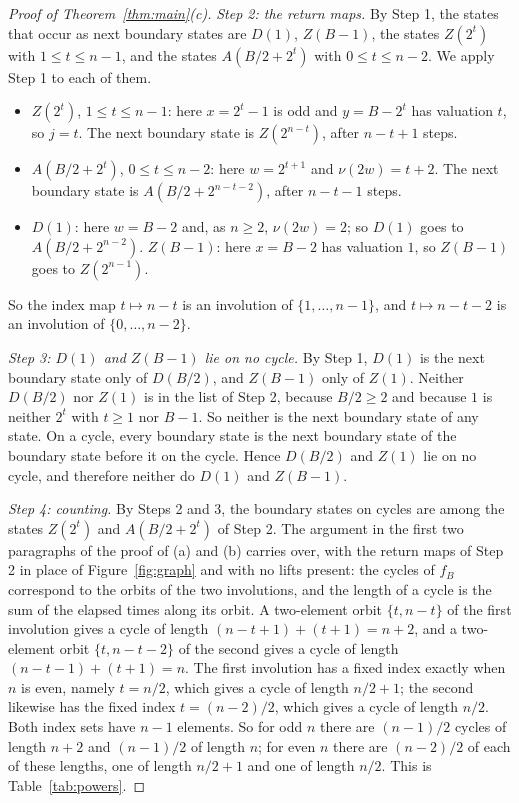 \documentclass[11pt]{amsart}
\theoremstyle{definition}
\theoremstyle{remark}
\newcommand{\vt}{\nu}
\begin{document}
\begin{proof}[Proof of Theorem~\ref{thm:main}\textup{(c)}]
\emph{Step 2: the return maps.} By Step 1, the states that occur as next boundary states are $D(1)$, $Z(B-1)$, the states $Z(2^t)$ with $1\le t\le n-1$, and the states $A(B/2+2^t)$ with $0\le t\le n-2$. We apply Step 1 to each of them.
\begin{itemize}
\item $Z(2^t)$, $1\le t\le n-1$: here $x=2^t-1$ is odd and $y=B-2^t$ has valuation $t$, so $j=t$. The next boundary state is $Z(2^{n-t})$, after $n-t+1$ steps.
\item $A(B/2+2^t)$, $0\le t\le n-2$: here $w=2^{t+1}$ and $\vt(2w)=t+2$. The next boundary state is $A(B/2+2^{n-t-2})$, after $n-t-1$ steps.
\item $D(1)$: here $w=B-2$ and, as $n\ge2$, $\vt(2w)=2$; so $D(1)$ goes to $A(B/2+2^{n-2})$. $Z(B-1)$: here $x=B-2$ has valuation $1$, so $Z(B-1)$ goes to $Z(2^{n-1})$.
\end{itemize}
So the index map $t\mapsto n-t$ is an involution of $\{1,\dots,n-1\}$, and $t\mapsto n-t-2$ is an involution of $\{0,\dots,n-2\}$.

\emph{Step 3: $D(1)$ and $Z(B-1)$ lie on no cycle.} By Step 1, $D(1)$ is the next boundary state only of $D(B/2)$, and $Z(B-1)$ only of $Z(1)$. Neither $D(B/2)$ nor $Z(1)$ is in the list of Step 2, because $B/2\ge2$ and because $1$ is neither $2^t$ with $t\ge1$ nor $B-1$. So neither is the next boundary state of any state. On a cycle, every boundary state is the next boundary state of the boundary state before it on the cycle. Hence $D(B/2)$ and $Z(1)$ lie on no cycle, and therefore neither do $D(1)$ and $Z(B-1)$.

\emph{Step 4: counting.} By Steps 2 and 3, the boundary states on cycles are among the states $Z(2^t)$ and $A(B/2+2^t)$ of Step 2. The argument in the first two paragraphs of the proof of (a) and (b) carries over, with the return maps of Step 2 in place of Figure~\ref{fig:graph} and with no lifts present: the cycles of $f_B$ correspond to the orbits of the two involutions, and the length of a cycle is the sum of the elapsed times along its orbit. A two-element orbit $\{t,n-t\}$ of the first involution gives a cycle of length $(n-t+1)+(t+1)=n+2$, and a two-element orbit $\{t,n-t-2\}$ of the second gives a cycle of length $(n-t-1)+(t+1)=n$. The first involution has a fixed index exactly when $n$ is even, namely $t=n/2$, which gives a cycle of length $n/2+1$; the second likewise has the fixed index $t=(n-2)/2$, which gives a cycle of length $n/2$. Both index sets have $n-1$ elements. So for odd $n$ there are $(n-1)/2$ cycles of length $n+2$ and $(n-1)/2$ of length $n$; for even $n$ there are $(n-2)/2$ of each of these lengths, one of length $n/2+1$ and one of length $n/2$. This is Table~\ref{tab:powers}.
\end{proof}
\end{document}
